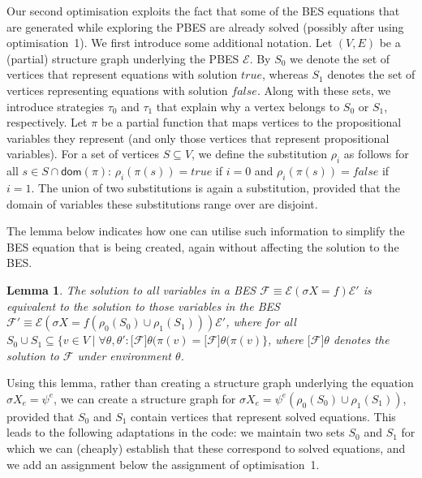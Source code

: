 \documentclass{article}
\newtheorem{lemma}[theorem]{Lemma}
\begin{document}
Our second optimisation exploits the fact that some of the BES
equations that are generated while exploring the PBES are already
solved (possibly after using optimisation~1).  We first introduce
some additional notation. Let $(V,E)$ be a (partial) structure graph
underlying the PBES $\mathcal{E}$.  By $S_0$ we denote the set of
vertices that represent equations with solution $true$, whereas
$S_1$ denotes the set of vertices representing equations with
solution $false$. Along with these sets, we introduce strategies $\tau_0$ and
$\tau_1$ that explain why a vertex belongs to $S_0$ or $S_1$, respectively. Let $\pi$ be a partial
function that maps vertices to the propositional variables they
represent (and only those vertices that represent propositional variables). 
For a set of vertices $S \subseteq V$, we define
the substitution $\rho_i$ as follows for all $s \in S \cap \textsf{dom}(\pi)$: 
$\rho_i(\pi(s)) = true$ if $i = 0$ and $\rho_i(\pi(s)) = false$ if
$i = 1$. The union of two substitutions is again a substitution, provided
that the domain of variables these substitutions range over are disjoint.

The lemma below indicates how one can utilise such information to simplify the BES equation 
that is being created, again without affecting the solution to the BES.

\begin{lemma}
The solution to all variables in a BES $\mathcal{F} \equiv \mathcal{E} (\sigma X = f) \mathcal{E}'$ is 
equivalent to the solution to those variables in the BES
$\mathcal{F}' \equiv \mathcal{E} (\sigma X = f(\rho_0(S_0) \cup \rho_1(S_1))) \mathcal{E}'$, where
for all $S_0 \cup S_1 \subseteq \{v \in V \mid \forall \theta,\theta':
\lbrack \mathcal{F} \rbrack \theta(\pi(v) = 
\lbrack \mathcal{F} \rbrack \theta(\pi(v)\}$, where $\lbrack \mathcal{F} \rbrack \theta$
denotes the solution to $\mathcal{F}$ under environment $\theta$.
\end{lemma}
Using this lemma, rather than creating a structure graph underlying the
equation $\sigma X_e = \psi^e$, we can create a structure graph
for $\sigma X_e = \psi^e(\rho_0(S_0) \cup \rho_1(S_1))$, provided that
$S_0$ and $S_1$ contain vertices that represent solved equations. 
This leads to the following adaptations in the code: we maintain
two sets $S_0$ and $S_1$ for which we can (cheaply) establish that these
correspond to solved equations, and we add an assignment below the assignment
of optimisation~1.
\end{document}
